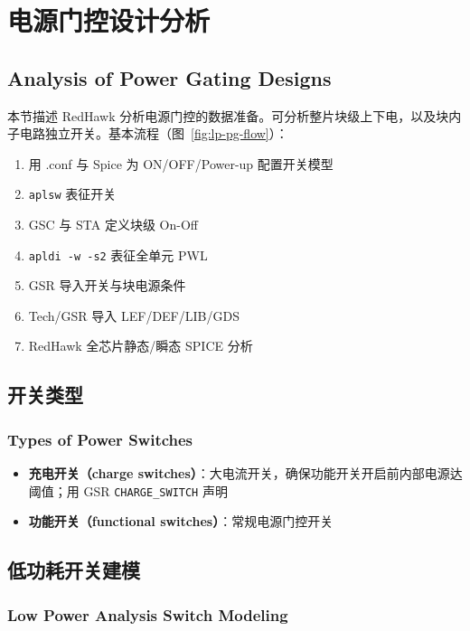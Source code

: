 \section{电源门控设计分析}
\subsection*{Analysis of Power Gating Designs}

本节描述 RedHawk 分析电源门控的数据准备。可分析整片块级上下电，以及块内子电路独立开关。基本流程（图~\ref{fig:lp-pg-flow}）：

\begin{enumerate}
  \item 用 .conf 与 Spice 为 ON/OFF/Power-up 配置开关模型
  \item \texttt{aplsw} 表征开关
  \item GSC 与 STA 定义块级 On-Off
  \item \texttt{apldi -w -s2} 表征全单元 PWL
  \item GSR 导入开关与块电源条件
  \item Tech/GSR 导入 LEF/DEF/LIB/GDS
  \item RedHawk 全芯片静态/瞬态 SPICE 分析
\end{enumerate}


\subsection{开关类型}
\subsubsection*{Types of Power Switches}

\begin{itemize}
  \item \textbf{充电开关（charge switches）}：大电流开关，确保功能开关开启前内部电源达阈值；用 GSR \texttt{CHARGE\_SWITCH} 声明
  \item \textbf{功能开关（functional switches）}：常规电源门控开关
\end{itemize}

\subsection{低功耗开关建模}
\subsubsection*{Low Power Analysis Switch Modeling}

